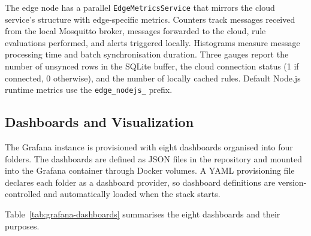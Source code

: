 The edge node has a parallel \texttt{EdgeMetricsService} that mirrors the cloud service's structure with edge-specific metrics. Counters track messages received from the local Mosquitto broker, messages forwarded to the cloud, rule evaluations performed, and alerts triggered locally. Histograms measure message processing time and batch synchronisation duration. Three gauges report the number of unsynced rows in the SQLite buffer, the cloud connection status (1 if connected, 0 otherwise), and the number of locally cached rules. Default Node.js runtime metrics use the \texttt{edge\_nodejs\_} prefix.

\subsection{Dashboards and Visualization}
\label{subsec:DashboardsAndVisualization}

The Grafana instance is provisioned with eight dashboards organised into four folders. The dashboards are defined as \gls{JSON} files in the repository and mounted into the Grafana container through Docker volumes. A \gls{YAML} provisioning file declares each folder as a dashboard provider, so dashboard definitions are version-controlled and automatically loaded when the stack starts.

Table~\ref{tab:grafana-dashboards} summarises the eight dashboards and their purposes.

